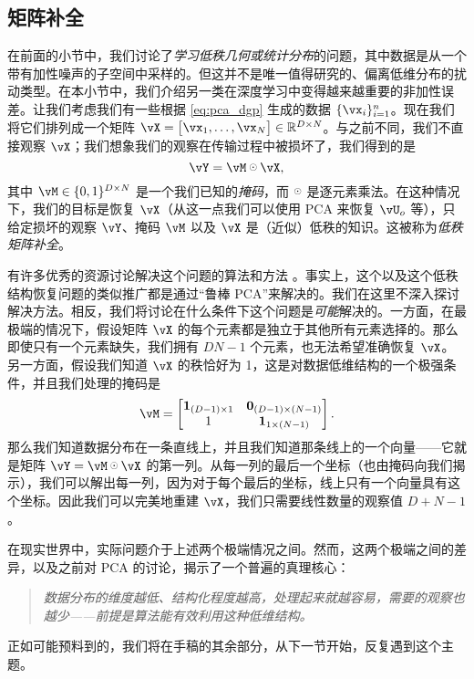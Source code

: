 \documentclass[../../book-main_zh.tex]{subfiles}
\begin{document}

\subsection{矩阵补全}

在前面的小节中，我们讨论了\textit{学习低秩几何或统计分布}的问题，其中数据是从一个带有加性噪声的子空间中采样的。但这并不是唯一值得研究的、偏离低维分布的扰动类型。在本小节中，我们介绍另一类在深度学习中变得越来越重要的非加性误差。让我们考虑我们有一些根据 \eqref{eq:pca_dgp} 生成的数据 \(\{\vx_{i}\}_{i = 1}^{n}\)。现在我们将它们排列成一个矩阵 \(\vX = \mat{\vx_{1}, \dots, \vx_{N}} \in \R^{D \times N}\)。与之前不同，我们不直接观察 \(\vX\)；我们想象我们的观察在传输过程中被损坏了，我们得到的是
\begin{equation}
    \vY = \vM \hada \vX,
\end{equation}
其中 \(\vM \in \{0, 1\}^{D \times N}\) 是一个我们已知的\textit{掩码}，而 \(\hada\) 是逐元素乘法。在这种情况下，我们的目标是恢复 \(\vX\)（从这一点我们可以使用 PCA 来恢复 \(\vU_{o}\) 等），只给定损坏的观察 \(\vY\)、掩码 \(\vM\) 以及 \(\vX\) 是（近似）低秩的知识。这被称为\textit{低秩矩阵补全}。

有许多优秀的资源讨论解决这个问题的算法和方法 \cite{Wright-Ma-2022}。事实上，这个以及这个低秩结构恢复问题的类似推广都是通过“鲁棒 PCA”来解决的。我们在这里不深入探讨解决方法。相反，我们将讨论在什么条件下这个问题是\textit{可能}解决的。一方面，在最极端的情况下，假设矩阵 \(\vX\) 的每个元素都是独立于其他所有元素选择的。那么即使只有一个元素缺失，我们拥有 \(DN - 1\) 个元素，也无法希望准确恢复 \(\vX\)。另一方面，假设我们知道 \(\vX\) 的秩恰好为 1，这是对数据低维结构的一个极强条件，并且我们处理的掩码是
\begin{equation}
    \vM = \mat{\vone_{(D - 1) \times 1} & \vzero_{(D - 1) \times (N - 1)} \\ 1 & \vone_{1 \times (N - 1)} }.
\end{equation}
那么我们知道数据分布在一条直线上，并且我们知道那条线上的一个向量——它就是矩阵 \(\vY = \vM \hada \vX\) 的第一列。从每一列的最后一个坐标（也由掩码向我们揭示），我们可以解出每一列，因为对于每个最后的坐标，线上只有一个向量具有这个坐标。因此我们可以完美地重建 \(\vX\)，我们只需要线性数量的观察值 \(D + N - 1\)。

在现实世界中，实际问题介于上述两个极端情况之间。然而，这两个极端之间的差异，以及之前对 PCA 的讨论，揭示了一个普遍的真理核心：
\begin{quote}
    \centering
    \textit{数据分布的维度越低、结构化程度越高，处理起来就越容易，需要的观察也越少——前提是算法能有效利用这种低维结构。}
\end{quote}
正如可能预料到的，我们将在手稿的其余部分，从下一节开始，反复遇到这个主题。
\end{document}
